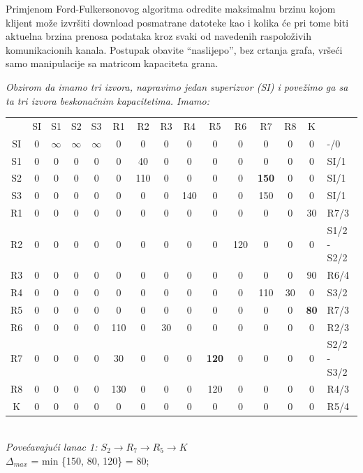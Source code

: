 \documentclass[12pt]{article}
\begin{document}
\begin{enumerate}
Primjenom Ford-Fulkersonovog algoritma odredite maksimalnu brzinu kojom klijent može izvršiti download posmatrane datoteke kao i kolika će pri tome biti aktuelna brzina prenosa podataka kroz svaki od navedenih raspoloživih komunikacionih kanala. Postupak obavite “naslijepo”, bez crtanja grafa, vršeći samo manipulacije sa matricom kapaciteta grana.\\
\begin{center}
    \textit{Obzirom da imamo tri izvora, napravimo jedan superizvor (SI) i povežimo ga sa ta tri izvora beskonačnim kapacitetima. Imamo:\\}
    \vspace{0.5cm}

\begin{tabular}{|c|c|c|c|c|c|c|c|c|c|c|c|c|c|l}
\cline{1-14}
 & SI & S1 & S2 & S3 & R1 & R2 & R3 & R4 & R5 & R6 & R7 & R8 & K &  \\ \cline{1-14}
SI & 0 & $\infty$ &$\infty$ & $\infty$ & 0 & 0 & 0 & 0 & 0 & 0 & 0 & 0 & 0 & -/0 \\ \cline{1-14}
S1 & 0 & 0 & 0 & 0 & 0 & 40 & 0 & 0 & 0 & 0 & 0 & 0 & 0 & SI/1 \\ \cline{1-14}
S2 & 0 & 0 & 0 & 0 & 0 & 110 & 0 & 0 & 0 & 0 & \textbf{150} & 0 & 0 & SI/1 \\ \cline{1-14}
S3 & 0 & 0 & 0 & 0 & 0 & 0 & 0 & 140 & 0 & 0 & 150 & 0 & 0 & SI/1 \\ \cline{1-14}
R1 & 0 & 0 & 0 & 0 & 0 & 0 & 0 & 0 & 0 & 0 & 0 & 0 & 30 & R7/3 \\ \cline{1-14}
R2 & 0 & 0 & 0 & 0 & 0 & 0 & 0 & 0 & 0 & 120 & 0 & 0 & 0 & S1/2 - S2/2 \\ \cline{1-14}
R3 & 0 & 0 & 0 & 0 & 0 & 0 & 0 & 0 & 0 & 0 & 0 & 0 & 90 & R6/4 \\ \cline{1-14}
R4 & 0 & 0 & 0 & 0 & 0 & 0 & 0 & 0 & 0 & 0 & 110 & 30 & 0 & S3/2 \\ \cline{1-14}
R5 & 0 & 0 & 0 & 0 & 0 & 0 & 0 & 0 & 0 & 0 & 0 & 0 & \textbf{80} & R7/3 \\ \cline{1-14}
R6 & 0 & 0 & 0 & 0 & 110 & 0 & 30 & 0 & 0 & 0 & 0 & 0 & 0 & R2/3 \\ \cline{1-14}
R7 & 0 & 0 & 0 & 0 & 30 & 0 & 0 & 0 & \textbf{120} & 0 & 0 & 0 & 0 & S2/2 - S3/2 \\ \cline{1-14}
R8 & 0 & 0 & 0 & 0 & 130 & 0 & 0 & 0 & 120 & 0 & 0 & 0 & 0 & R4/3 \\ \cline{1-14}
K & 0 & 0 & 0 & 0 & 0 & 0 & 0 & 0 & 0 & 0 & 0 & 0 & 0 & R5/4 \\ \cline{1-14}
\end{tabular}
\\
\vspace{0.5cm}
\textit{Povećavajući lanac 1: $S_2 \rightarrow R_7 \rightarrow R_5 \rightarrow K$}\\
$\Delta_{max}$ = min \{150, 80, 120\} = 80;\\
\vspace{0.5cm}




\end{center}
\end{enumerate}
\end{document}
